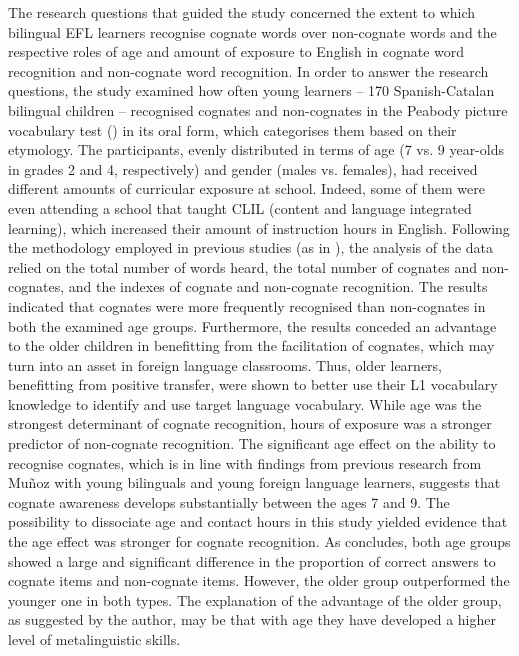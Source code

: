 \documentclass[output=paper,colorlinks,citecolor=brown,nonflat]{langsci/langscibook}
\begin{document}
The research questions that guided the study concerned the extent to which bilingual EFL learners recognise cognate words over non-cognate words and the respective roles of age and amount of exposure to English in cognate word recognition and non-cognate word recognition. In order to answer the research questions, the study examined how often young learners – 170 Spanish-Catalan bilingual children – recognised cognates and non-cognates in the Peabody picture vocabulary test (\citealt{DunnDunn2007}) in its oral form, which categorises them based on their etymology. The participants, evenly distributed in terms of age (7 vs. 9 year-olds in grades 2 and 4, respectively) and gender (males vs. females), had received different amounts of curricular exposure at school. Indeed, some of them were even attending a school that taught CLIL (content and language integrated learning), which increased their amount of instruction hours in English. Following the methodology employed in previous studies (as in \citealt{MuñozCadiernoCasas2018}), the analysis of the data relied on the total number of words heard, the total number of cognates and non-cognates, and the indexes of cognate and non-cognate recognition. The results indicated that cognates were more frequently recognised than non-cognates in both the examined age groups. Furthermore, the results conceded an advantage to the older children in benefitting from the facilitation of cognates, which may turn into an asset in foreign language classrooms. Thus, older learners, benefitting from positive transfer, were shown to better use their L1 vocabulary knowledge to identify and use target language vocabulary. While age was the strongest determinant of cognate recognition, hours of exposure was a stronger predictor of non-cognate recognition. The significant age effect on the ability to recognise cognates, which is in line with findings from previous research from Muñoz with young bilinguals and young foreign language learners, suggests that cognate awareness develops substantially between the ages 7 and 9. The possibility to dissociate age and contact hours in this study yielded evidence that the age effect was stronger for cognate recognition. As \citeauthor{chapters/munoz} concludes, both age groups showed a large and significant difference in the proportion of correct answers to cognate items and non-cognate items. However, the older group outperformed the younger one in both types. The explanation of the advantage of the older group, as suggested by the author, may be that with age they have developed a higher level of metalinguistic skills.
\end{document}
